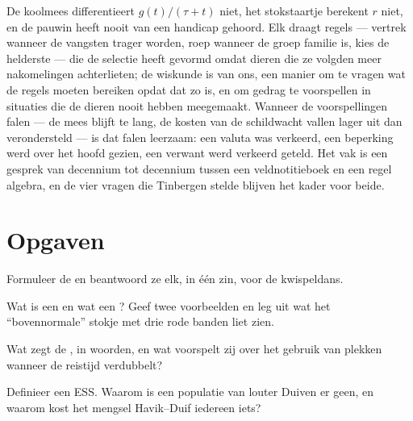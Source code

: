\begin{remark}\label{rem:b3:behavioural-ecology:remark}
De koolmees differentieert $g(t)/(\tau + t)$ niet, het stokstaartje
berekent $r$ niet, en de pauwin heeft nooit van een handicap gehoord.
Elk draagt regels --- vertrek wanneer de vangsten trager worden, roep
wanneer de groep familie is, kies de helderste --- die de selectie
heeft gevormd omdat dieren die ze volgden meer nakomelingen
achterlieten; de wiskunde is van ons, een manier om te vragen wat de
regels moeten bereiken opdat dat zo is, en om gedrag te voorspellen in
situaties die de dieren nooit hebben meegemaakt. Wanneer de
voorspellingen falen --- de mees blijft te lang, de kosten van de
schildwacht vallen lager uit dan verondersteld --- is dat falen
leerzaam: een valuta was verkeerd, een beperking werd over het hoofd
gezien, een verwant werd verkeerd geteld. Het vak is een gesprek van
decennium tot decennium tussen een veldnotitieboek en een regel
algebra, en de vier vragen die Tinbergen stelde blijven het kader voor
beide.
\end{remark}

\section{Opgaven}

\begin{exercise}[$\star$]\label{exo:b3:behavioural-ecology:1}
Formuleer de  en beantwoord ze elk, in één
zin, voor de kwispeldans.
\end{exercise}

\begin{exercise}[$\star$]\label{exo:b3:behavioural-ecology:2}
Wat is een  en wat een ? Geef twee
voorbeelden en leg uit wat het ``bovennormale'' stokje met drie rode
banden liet zien.
\end{exercise}

\begin{exercise}[$\star$]\label{exo:b3:behavioural-ecology:3}
Wat zegt de , in woorden, en wat
voorspelt zij over het gebruik van plekken wanneer de reistijd
verdubbelt?
\end{exercise}

\begin{exercise}[$\star$]\label{exo:b3:behavioural-ecology:4}
Definieer een ESS. Waarom is een populatie van louter Duiven er geen,
en waarom kost het mengsel Havik--Duif iedereen iets?
\end{exercise}

